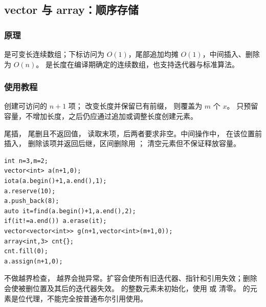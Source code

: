 \subsection{vector 与 array：顺序存储}
\label{stl:vector}
\subsubsection*{原理}
 是可变长连续数组；下标访问为 $O(1)$，尾部追加均摊 $O(1)$，中间插入、删除为 $O(n)$。 是长度在编译期确定的连续数组，也支持迭代器与标准算法。
\subsubsection*{使用教程}
 创建可访问的 $n+1$ 项； 改变长度并保留已有前缀， 则覆盖为 $m$ 个 $x$。 只预留容量，不增加长度，之后仍应通过追加或调整长度创建元素。

 尾插， 尾删且不返回值， 读取末项，后两者要求非空。中间操作中， 在该位置前插入， 删除该项并返回后继，区间删除用 ； 清空元素但不保证释放容量。
\begin{lstlisting}[style=mtycpp,numbers=none]
int n=3,m=2;
vector<int> a(n+1,0);
iota(a.begin()+1,a.end(),1);
a.reserve(10);
a.push_back(8);
auto it=find(a.begin()+1,a.end(),2);
if(it!=a.end()) a.erase(it);
vector<vector<int>> g(n+1,vector<int>(m+1,0));
array<int,3> cnt{};
cnt.fill(0);
a.assign(n+1,0);
\end{lstlisting}
 不做越界检查， 越界会抛异常。扩容会使所有旧迭代器、指针和引用失效；删除会使被删位置及其后的迭代器失效。 的整数元素未初始化，使用  或  清零。 的元素是位代理，不能完全按普通布尔引用使用。
